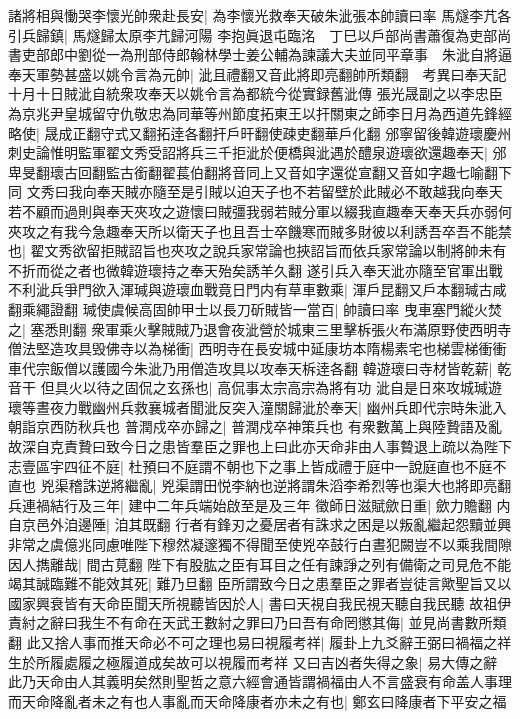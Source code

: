 諸將相與慟哭李懷光帥衆赴長安|{
	為李懷光救奉天破朱泚張本帥讀曰率}
馬燧李芁各引兵歸鎮|{
	馬燧歸太原李芁歸河陽}
李抱眞退屯臨洺　丁巳以戶部尚書蕭復為吏部尚書吏部郎中劉從一為刑部侍郎翰林學士姜公輔為諫議大夫並同平章事　朱泚自將逼奉天軍勢甚盛以姚令言為元帥|{
	泚且禮翻又音此將即亮翻帥所類翻　考異曰奉天記十月十日賊泚自統衆攻奉天以姚令言為都統今從實録舊泚傳}
張光晟副之以李忠臣為京兆尹皇城留守仇敬忠為同華等州節度拓東王以扞關東之師李日月為西道先鋒經略使|{
	晟成正翻守式又翻拓逹各翻扞戶旰翻使疎吏翻華戶化翻}
邠寧留後韓遊瓌慶州刺史論惟明監軍翟文秀受詔將兵三千拒泚於便橋與泚遇於醴泉遊瓌欲還趣奉天|{
	邠卑旻翻瓌古回翻監古銜翻翟萇伯翻將音同上又音如字還從宣翻又音如字趣七喻翻下同}
文秀曰我向奉天賊亦隨至是引賊以迫天子也不若留壁於此賊必不敢越我向奉天若不顧而過則與奉天夾攻之遊懷曰賊彊我弱若賊分軍以綴我直趣奉天奉天兵亦弱何夾攻之有我今急趣奉天所以衛天子也且吾士卒饑寒而賊多財彼以利誘吾卒吾不能禁也|{
	翟文秀欲留拒賊詔旨也夾攻之說兵家常論也挾詔旨而依兵家常論以制將帥未有不折而從之者也微韓遊瓌持之奉天殆矣誘羊久翻}
遂引兵入奉天泚亦隨至官軍出戰不利泚兵爭門欲入渾瑊與遊瓌血戰竟日門内有草車數乘|{
	渾戶昆翻又戶本翻瑊古咸翻乘繩證翻}
瑊使虞候高固帥甲士以長刀斫賊皆一當百|{
	帥讀曰率}
曳車塞門縱火焚之|{
	塞悉則翻}
衆軍乘火擊賊賊乃退會夜泚營於城東三里擊柝張火布滿原野使西明寺僧法堅造攻具毁佛寺以為梯衝|{
	西明寺在長安城中延康坊本隋楊素宅也梯雲梯衝衝車代宗飯僧以護國今朱泚乃用僧造攻具以攻奉天柝逹各翻}
韓遊瓌曰寺材皆乾薪|{
	乾音干}
但具火以待之固侃之玄孫也|{
	高侃事太宗高宗為將有功}
泚自是日來攻城瑊遊瓌等晝夜力戰幽州兵救襄城者聞泚反突入潼關歸泚於奉天|{
	幽州兵即代宗時朱泚入朝詣京西防秋兵也}
普潤戍卒亦歸之|{
	普潤戍卒神策兵也}
有衆數萬上與陸贄語及亂故深自克責贄曰致今日之患皆羣臣之罪也上曰此亦天命非由人事䞇退上疏以為陛下志壹區宇四征不庭|{
	杜預曰不庭謂不朝也下之事上皆成禮于庭中一說庭直也不庭不直也}
兇渠稽誅逆將繼亂|{
	兇渠謂田悦李納也逆將謂朱滔李希烈等也渠大也將即亮翻}
兵連禍結行及三年|{
	建中二年兵端始啟至是及三年}
徵師日滋賦歛日重|{
	歛力贍翻}
内自京邑外洎邊陲|{
	洎其既翻}
行者有鋒刃之憂居者有誅求之困是以叛亂繼起怨黷並興非常之虞億兆同慮唯陛下穆然凝邃獨不得聞至使兇卒鼓行白晝犯闕豈不以乘我間隙因人擕離哉|{
	間古莧翻}
陛下有股肱之臣有耳目之任有諫諍之列有備衛之司見危不能竭其誠臨難不能效其死|{
	難乃旦翻}
臣所謂致今日之患羣臣之罪者豈徒言歟聖旨又以國家興衰皆有天命臣聞天所視聽皆因於人|{
	書曰天視自我民視天聽自我民聽}
故祖伊責紂之辭曰我生不有命在天武王數紂之罪曰乃曰吾有命罔懲其侮|{
	並見尚書數所類翻}
此又捨人事而推天命必不可之理也易曰視履考祥|{
	履卦上九爻辭王弼曰禍福之祥生於所履處履之極履道成矣故可以視履而考祥}
又曰吉凶者失得之象|{
	易大傳之辭}
此乃天命由人其義明矣然則聖哲之意六經會通皆謂禍福由人不言盛衰有命盖人事理而天命降亂者未之有也人事亂而天命降康者亦未之有也|{
	鄭玄曰降康者下平安之福}
